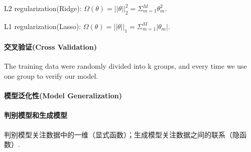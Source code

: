 \documentclass[12pt,a4paper]{article}
\theoremstyle{mythm}
\begin{document}
L2 regularization(Ridge): $\Omega(\theta) = ||\theta||^2_2 = \Sigma_{m=1}^M\theta_m^2$.

L1 regularization(Lasso): $\Omega(\theta) = ||\theta||_1 = \Sigma_{m=1}^M|\theta_m|.$

\paragraph{交叉验证(Cross Validation)} The training data were randomly divided into k groups, and every time we use one group to verify our model.


\paragraph{模型泛化性(Model Generalization)} 

\paragraph{判别模型和生成模型} 判别模型关注数据中的一维（显式函数）；生成模型关注数据之间的联系（隐函数）.










    
\end{document}
